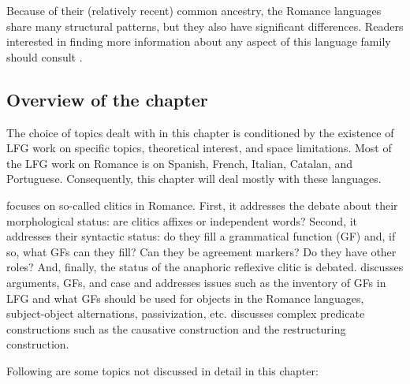 \documentclass[output=paper,hidelinks]{langscibook}
\begin{document}
Because of their (relatively recent) common ancestry, the Romance languages share many structural patterns, but they also have significant differences. Readers interested in finding more information about any aspect of this language family should consult \citet{LedgewayMaiden2016}.

\subsection{Overview of the chapter}
\label{sec:Romance:1.2}

The choice of topics dealt with in this chapter is conditioned by the existence of LFG work on specific topics, theoretical interest, and space limitations. Most of the LFG work on Romance is on Spanish, French, Italian, Catalan, and Portuguese. Consequently, this chapter will deal mostly with these languages.

 focuses on so-called clitics in Romance. First, it addresses the debate about their morphological status: are clitics affixes or independent words? Second, it addresses their syntactic status: do they fill a grammatical function (GF) and, if so, what GFs can they fill? Can they be agreement markers? Do they have other roles? And, finally, the status of the anaphoric reflexive clitic is debated.  discusses arguments, GFs, and case and addresses issues such as the inventory of GFs in LFG and what GFs should be used for objects in the Romance languages, subject-object alternations, passivization, etc.  discusses complex predicate constructions such as the causative construction and the restructuring construction.

Following are some topics not discussed in detail in this chapter:
\end{document}
